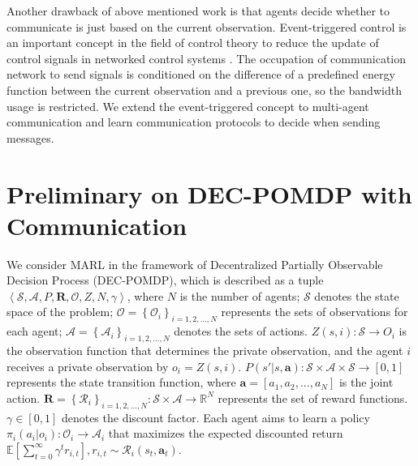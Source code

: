 \documentclass[letterpaper]{article} %
\begin{document}
Another drawback of above mentioned work is that agents decide whether to communicate is just based on the current observation.
Event-triggered control is an important concept in the field of control theory to reduce the update of control signals in networked control systems \cite{et2012, zhu2016event, zhang2017event}. The occupation of communication network to send signals is conditioned on the difference of a predefined energy function between the current observation and a previous one, so the bandwidth usage is restricted.
We extend the event-triggered concept to multi-agent communication and learn communication protocols to decide when sending messages.












\section{Preliminary on DEC-POMDP with Communication}\label{sec:Background}

We consider MARL in the framework of Decentralized Partially Observable Decision Process (DEC-POMDP), which is described as a tuple $\left\langle \mathcal{S}, \boldsymbol{\mathcal{A}},P,\boldsymbol{R}, \boldsymbol{\mathcal{O}}, Z, N,\gamma \right\rangle$, where $N$ is the number of agents; $\mathcal{S}$ denotes the state space of the problem;
$\boldsymbol{\mathcal{O}} = \left\{ \mathcal{O}_i \right\}_{i=1,2,...,N}$ represents the sets of observations for each agent;
$\boldsymbol{\mathcal{A}} = \left\{ \mathcal{A}_i \right\}_{i=1,2,...,N}$ denotes the sets of actions.
$Z(s,i): \mathcal{S} \rightarrow O_i$ is the observation function that determines the private observation, and
the agent $i$ receives a private observation by $o_i = Z(s,i)$.
$P(s'|s, \boldsymbol{a}) : \mathcal{S} \times \boldsymbol{\mathcal{A}} \times \mathcal{S} \rightarrow [0,1]$ represents the state transition function, where $\boldsymbol{a}=[a_1,a_2,...,a_N]$ is the joint action.
$\boldsymbol{R} = \left\{ \mathcal{R}_i \right\}_{i=1,2,...,N}: \mathcal{S} \times \boldsymbol{\mathcal{A}} \rightarrow \mathbb{R}^N$ represents the set of reward functions.
$\gamma \in [0,1]$ denotes the discount factor.
Each agent aims to learn a policy $\pi_i(a_i|o_i): \mathcal{O}_i \rightarrow \mathcal{A}_i$ that maximizes the expected discounted return $\mathbb{E}\left[ \sum_{t=0}^\infty \gamma^t r_{i,t} \right], r_{i,t} \sim \mathcal{R}_i(s_t,\boldsymbol{a}_t)$.
\end{document}
